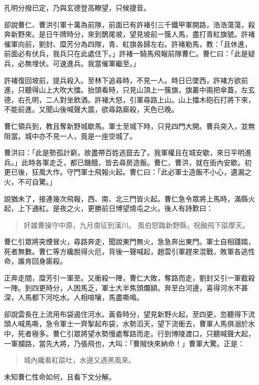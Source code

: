 孔明分撥已定，乃與玄德登高瞭望，只候捷音。

卻說曹仁、曹洪引軍十萬為前隊，前面已有許褚引三千鐵甲軍開路，浩浩蕩蕩，殺奔新野來。是日午牌時分，來到鵲尾坡，望見坡前一簇人馬，盡打青紅旗號。許褚催軍向前，劉封、糜芳分為四隊，青、紅旗各歸左右。許褚勒馬，教：「且休進，前面必有伏兵，我兵只在此處住下。」許褚一騎馬飛報前隊曹仁。曹仁曰：「此是疑兵，必無埋伏。可速進兵。我當催軍繼至。」

許褚復回坡前，提兵殺入。至林下追尋時，不見一人。時日已墜西，許褚方欲前進，只聽得山上大吹大擂。抬頭看時，只見山頂上一簇旗，旗叢中兩把傘蓋，左玄德，右孔明，二人對坐飲酒。許褚大怒，引軍尋路上山。山上擂木砲石打將下來，不能前進。又聞山後喊聲大震，欲尋路廝殺，天色已晚。

曹仁領兵到，教且奪新野城歇馬。軍士至城下時，只見四門大開。曹兵突入，並無阻當。城中亦不見一人，竟是一座空城了。

曹洪曰：「此是勢孤計窮，故盡帶百姓逃竄去了。我軍權且在城安歇，來日平明進兵。」此時各軍走乏，都已饑餓，皆去尋房造飯。曹仁、曹洪，就在衙內安歇。初更已後，狂風大作。守門軍士飛報火起。曹仁曰：「此必軍士造飯不小心，遺漏之火，不可自驚。」

說猶未了，接連幾次飛報，西、南、北三門皆火起。曹仁急令眾將上馬時，滿縣火起，上下通紅。是夜之火，更勝前日博望燒屯之火。後人有詩歎曰：

\begin{quote}
奸雄曹操守中原，九月南征到漢川。
風伯怒臨新野縣，祝融飛下燄摩天。
\end{quote}

曹仁引眾將突煙冒火，尋路奔走，聞說東門無火，急急奔出東門。軍士自相踐踏，死者無數。曹仁等方纔脫得火厄，背後一聲喊起，趙雲引軍趕來混戰，敗軍各逃性命，誰肯回身廝殺。

正奔走間，糜芳引一軍至。又衝殺一陣，曹仁大敗，奪路而走，劉封又引一軍截殺一陣。到四更時分，人困馬乏，軍士大半焦頭爛額。奔至白河邊，喜得河水不甚深，人馬都下河吃水。人相喧嚷，馬盡嘶鳴。

卻說雲長在上流用布袋遏住河水。黃昏時分，望見新野火起，至四更，忽聽得下流頭人喊馬嘶，急令軍士一齊掣起布袋，水勢滔天，望下流衝去，曹軍人馬俱溺於水中，死者極多。曹仁引眾將望水勢慢處奪路而走。行到博陵渡口，只聽喊聲大起，一軍攔路，當先大將，乃張飛也，大叫：「曹賊快來納命！」曹軍大驚。正是：

\begin{quote}
城內纔看紅燄吐，水邊又遇黑風來。
\end{quote}

未知曹仁性命如何，且看下文分解。

